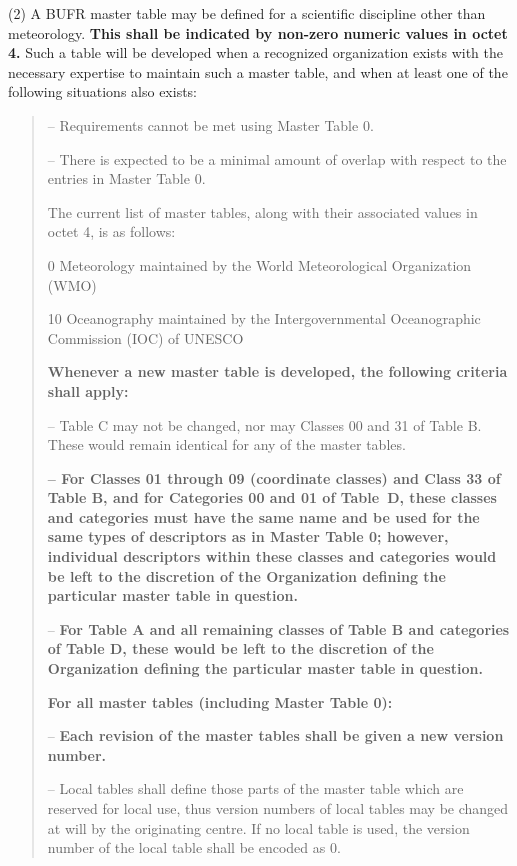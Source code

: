 (2) A BUFR master table may be defined for a scientific discipline other than meteorology. \textbf{This shall be indicated by non-zero numeric values in octet 4.} Such a table will be developed when a recognized organization exists with the necessary expertise to maintain such a master table, and when at least one of the following situations also exists:

\begin{quote}
-- Requirements cannot be met using Master Table 0.

-- There is expected to be a minimal amount of overlap with respect to the entries in Master Table 0.

The current list of master tables, along with their associated values in octet 4, is as follows:

0 Meteorology maintained by the World Meteorological Organization (WMO)

10 Oceanography maintained by the Intergovernmental Oceanographic Commission (IOC) of UNESCO

\textbf{Whenever a new master table is developed, the following criteria shall apply:}

-- Table C may not be changed, nor may Classes 00 and 31 of Table B. These would remain identical for any of the master tables.

\textbf{-- For Classes 01 through 09 (coordinate classes) and Class 33 of Table B, and for Categories 00 and 01 of Table~D, these classes and categories must have the same name and be used for the same types of descriptors as in Master Table 0; however, individual descriptors within these classes and categories would be left to the discretion of the Organization defining the particular master table in question.}

-- \textbf{For Table A and all remaining classes of Table B and categories of Table D, these would be left to the discretion of the Organization defining the particular master table in question.}

\textbf{For all master tables (including Master Table 0):}

-- \textbf{Each revision of the master tables shall be given a new version number.}

-- Local tables shall define those parts of the master table which are reserved for local use, thus version numbers of local tables may be changed at will by the originating centre. If no local table is used, the version number of the local table shall be encoded as 0.
\end{quote}

